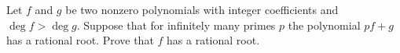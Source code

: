 Let $f$ and $g$ be two nonzero polynomials with integer coefficients and $\deg f > \deg g$. Suppose that for infinitely many primes $p$ the polynomial $pf + g$ has a rational root. Prove that $f$ has a rational root.
